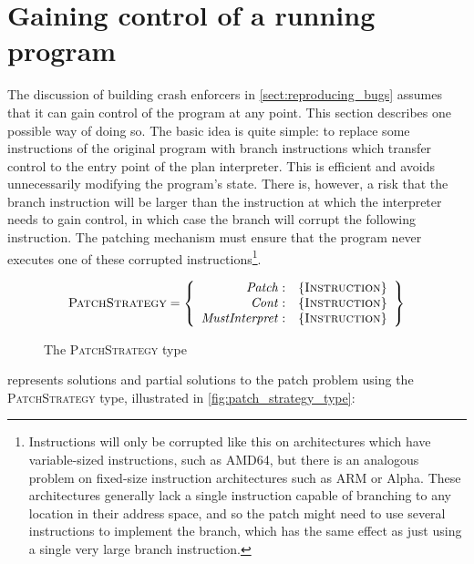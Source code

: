 \chapter{Gaining control of a running program}
\label{sect:enforce:gain_control}


The discussion of building crash enforcers in
\autoref{sect:reproducing_bugs} assumes that it can gain control of
the program at any point.  This section describes one possible way of
doing so.  The basic idea is quite simple: to replace some
instructions of the original program with branch instructions which
transfer control to the entry point of the plan interpreter.  This is
efficient and avoids unnecessarily modifying the program's state.
There is, however, a risk that the branch instruction will be larger
than the instruction at which the interpreter needs to gain control,
in which case the branch will corrupt the following instruction.  The
patching mechanism must ensure that the program never executes one of
these corrupted instructions\footnote{Instructions will only be
  corrupted like this on architectures which have variable-sized
  instructions, such as AMD64, but there is an analogous problem on
  fixed-size instruction architectures such as ARM or Alpha.  These
  architectures generally lack a single instruction capable of
  branching to any location in their address space, and so the patch
  might need to use several instructions to implement the branch,
  which has the same effect as just using a single very large branch
  instruction.}.

\begin{figure}[tp]
  \begin{displaymath}
    \textsc{PatchStrategy} = \left\{\begin{array}{rl}
    \mathit{Patch}: & \{\textsc{Instruction}\} \\
    \mathit{Cont}: & \{\textsc{Instruction}\} \\
    \mathit{MustInterpret}: & \{\textsc{Instruction}\}
    \end{array}\right\}
  \end{displaymath}
  \caption{The \textsc{PatchStrategy} type}
  \label{fig:patch_strategy_type}
\end{figure}

{\Implementation} represents solutions and partial solutions to the
patch problem using the \textsc{PatchStrategy} type, illustrated in
\autoref{fig:patch_strategy_type}:

